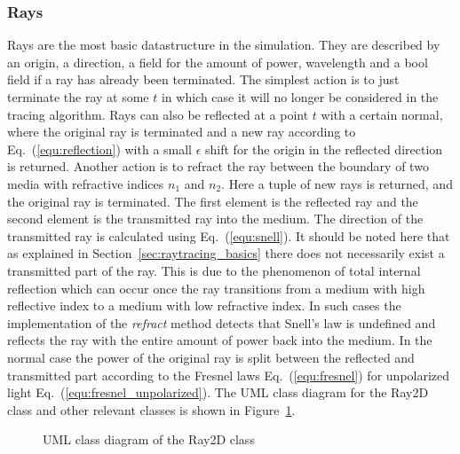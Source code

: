 \documentclass[a4paper,10pt]{article}
\newcommand{\equref}[1]{Eq.~(\ref{#1})}
\newcommand{\secref}[1]{Section~\ref{#1}}
\newcommand{\figref}[1]{Figure~\ref{#1}}
\begin{document}
    \subsubsection{Rays}

    Rays are the most basic datastructure in the simulation.
    They are described by an origin, a direction, a field for the
    amount of power, wavelength and a bool field if a ray has
    already been terminated.
    The simplest action is to just terminate the ray at some $t$
    in which case it will no longer be considered in the tracing
    algorithm.
    Rays can also be reflected at a point $t$ with a certain normal, 
    where the original ray is terminated and a new ray according to \equref{equ:reflection} with a small
    $\epsilon$ shift for the origin in the reflected direction is returned.
    Another action is to refract the ray between the boundary
    of two media with refractive indices $n_1$ and $n_2$.
    Here a tuple of new rays is returned, and the original ray
    is terminated.
    The first element is the reflected ray and the second
    element is the transmitted ray into the medium.
    The direction of the transmitted ray is calculated using
    \equref{equ:snell}.
    It should be noted here that as explained in
    \secref{sec:raytracing_basics}
    there does not necessarily exist a transmitted part of the ray.
    This is due to the phenomenon of total internal reflection
    which can occur once the ray transitions from a medium with high
    reflective index to a medium with low refractive index.
    In such cases the implementation of the \emph{refract} method
    detects that Snell's law is undefined and reflects the ray
    with the entire amount of power back into the medium.
    In the normal case the power of the original ray
    is split between the reflected and transmitted part according
    to the Fresnel laws \equref{equ:fresnel} for unpolarized
    light \equref{equ:fresnel_unpolarized}. 
    The UML class diagram for the Ray2D class and other relevant
    classes is shown in \figref{fig:uml_ray2d}.

    \begin{center}
    \begin{figure}
    \centering
    \caption{UML class diagram of the Ray2D class}
    \label{fig:uml_ray2d}
    \end{figure}
    \end{center}
\end{document}
